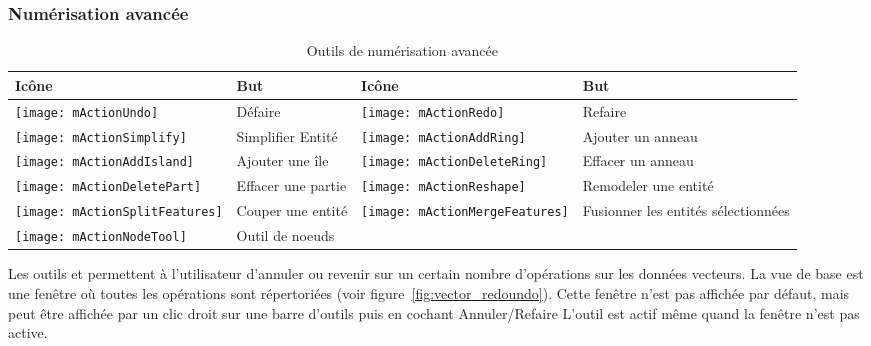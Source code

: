 \begin{itemize}
\subsubsection{Numérisation avancée}
\label{sec:advanced_edit}

\begin{table}[h]
\centering
\caption{Outils de numérisation avancée}\label{tab:advanced_editing}\medskip
\small
\begin{tabular}{|l|p{6.9cm}|l|p{6.9cm}|}
\hline \textbf{Icône} & \textbf{But} & \textbf{Icône} & \textbf{But} \\
\hline \texttt{[image: mActionUndo]}
   & Défaire 
   & \texttt{[image: mActionRedo]}
   & Refaire \\
\hline \texttt{[image: mActionSimplify]}
   & Simplifier Entité
   & \texttt{[image: mActionAddRing]}
   & Ajouter un anneau \\
\hline \texttt{[image: mActionAddIsland]}
   & Ajouter une île
   & \texttt{[image: mActionDeleteRing]}
   & Effacer un anneau \\
\hline \texttt{[image: mActionDeletePart]}
   & Effacer une partie
   & \texttt{[image: mActionReshape]}
   & Remodeler une entité \\
\hline \texttt{[image: mActionSplitFeatures]}
   & Couper une entité
   & \texttt{[image: mActionMergeFeatures]}
   & Fusionner les entités sélectionnées \\
\hline \texttt{[image: mActionNodeTool]}
   & Outil de noeuds
   &
   & \\
\hline
\end{tabular}
\end{table}


Les outils  et  permettent à l'utilisateur d'annuler ou revenir sur un certain nombre d'opérations sur les données vecteurs. La vue de base est une fenêtre où toutes les opérations sont répertoriées (voir figure~\ref{fig:vector_redoundo}). Cette fenêtre n'est pas affichée par défaut, mais peut être affichée par un clic droit sur une barre d'outils puis en cochant Annuler/Refaire L'outil est actif même quand la fenêtre n'est pas active.


\end{itemize}
